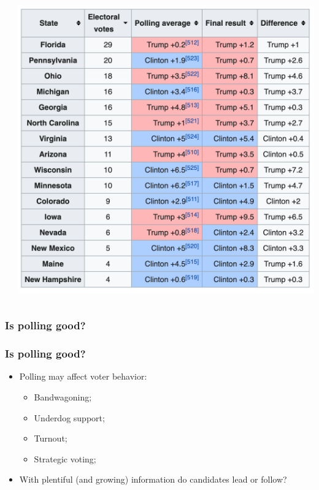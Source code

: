 \documentclass[aspectratio=169]{beamer}
\theoremstyle{principle}
\begin{document}
\begin{frame}
\begin{columns}
\begin{column}{0.5\textwidth}
\end{column}
\begin{column}{0.5\textwidth}
\begin{center}
\includegraphics[scale=0.35]{polling_2016.png}
\end{center}
\end{column}
\end{columns}

\end{frame}

\begin{frame}
\frametitle{Is polling good?}


\end{frame}

\begin{frame}
\frametitle{Is polling good?}

\begin{itemize}
\item Polling may affect voter behavior:
\begin{itemize}
\item Bandwagoning;
\item Underdog support;
\item Turnout;
\item Strategic voting;
\end{itemize}
\bigskip
\bigskip
\bigskip

\item With plentiful (and growing) information do candidates lead or follow?

\end{itemize}

\end{frame}
\end{document}
